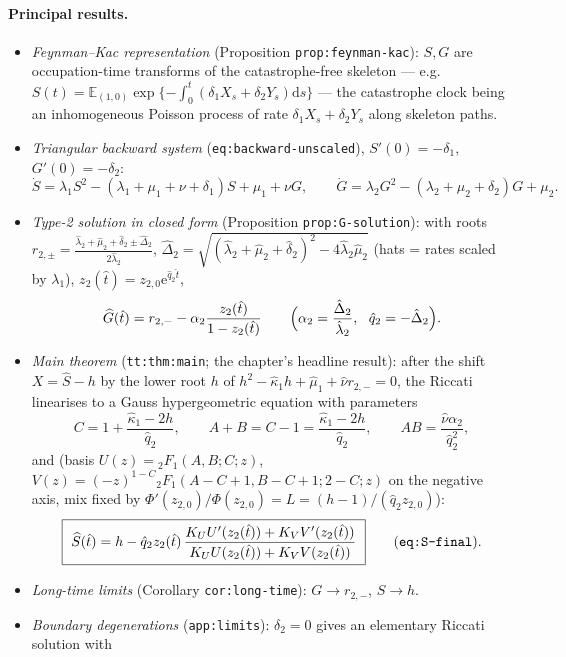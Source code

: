 \documentclass[11pt,a4paper]{article}
\newcommand{\EX}{\mathbb{E}}
\newcommand{\ee}{\mathrm{e}}
\newcommand{\dd}{\mathrm{d}}
\begin{document}
\paragraph{Principal results.}
\begin{itemize}
\item \emph{Feynman--Kac representation} (Proposition
  \texttt{prop:feynman-kac}): $S,G$ are occupation-time transforms of the
  catastrophe-free skeleton --- e.g.
  $S(t)=\EX_{(1,0)}\exp\{-\int_0^t(\delta_1X_s+\delta_2Y_s)\dd s\}$ ---
  the catastrophe clock being an inhomogeneous Poisson process of rate
  $\delta_1X_s+\delta_2Y_s$ along skeleton paths.
\item \emph{Triangular backward system} (\texttt{eq:backward-unscaled}),
  $S'(0)=-\delta_1$, $G'(0)=-\delta_2$:
  \[
  \dot S=\lambda_1S^2-(\lambda_1+\mu_1+\nu+\delta_1)S+\mu_1+\nu G,
  \qquad
  \dot G=\lambda_2G^2-(\lambda_2+\mu_2+\delta_2)G+\mu_2 .
  \]
\item \emph{Type-2 solution in closed form} (Proposition
  \texttt{prop:G-solution}): with roots
  $r_{2,\pm}=\frac{\hat\lambda_2+\hat\mu_2+\hat\delta_2\pm\hat\Delta_2}
  {2\hat\lambda_2}$, $\hat\Delta_2=\sqrt{(\hat\lambda_2+\hat\mu_2+
  \hat\delta_2)^2-4\hat\lambda_2\hat\mu_2}$ (hats = rates scaled by
  $\lambda_1$), $z_2(\hat t)=z_{2,0}\ee^{\hat q_2\hat t}$,
  \[
  \widehat G(\hat t)=r_{2,-}-\alpha_2\frac{z_2(\hat t)}{1-z_2(\hat t)}
  \qquad\Bigl(\alpha_2=\frac{\hat\Delta_2}{\hat\lambda_2},\ \
  \hat q_2=-\hat\Delta_2\Bigr).
  \]
\item \emph{Main theorem} (\texttt{tt:thm:main}; the chapter's headline
  result): after the shift $X=\widehat S-h$ by the lower root $h$ of
  $h^2-\hat\kappa_1h+\hat\mu_1+\hat\nu r_{2,-}=0$, the Riccati linearises
  to a Gauss hypergeometric equation with parameters
  \[
  C=1+\frac{\hat\kappa_1-2h}{\hat q_2},\qquad
  A+B=C-1=\frac{\hat\kappa_1-2h}{\hat q_2},\qquad
  AB=\frac{\hat\nu\alpha_2}{\hat q_2^2},
  \]
  and (basis $U(z)={}_2F_1(A,B;C;z)$, $V(z)=(-z)^{1-C}{}_2F_1(A-C+1,
  B-C+1;2-C;z)$ on the negative axis, mix fixed by
  $\Phi'(z_{2,0})/\Phi(z_{2,0})=L=(h-1)/(\hat q_2z_{2,0})$):
  \[
  \boxed{\ \widehat S(\hat t)=h-\hat q_2z_2(\hat t)\,
  \frac{K_UU'(z_2(\hat t))+K_VV'(z_2(\hat t))}
  {K_UU(z_2(\hat t))+K_VV(z_2(\hat t))}\ }
  \qquad\text{(\texttt{eq:S-final})}.
  \]
\item \emph{Long-time limits} (Corollary \texttt{cor:long-time}):
  $G\to r_{2,-}$, $S\to h$.
\item \emph{Boundary degenerations} (\texttt{app:limits}):
  $\delta_2=0$ gives an elementary Riccati solution with

\end{itemize}
\end{document}
